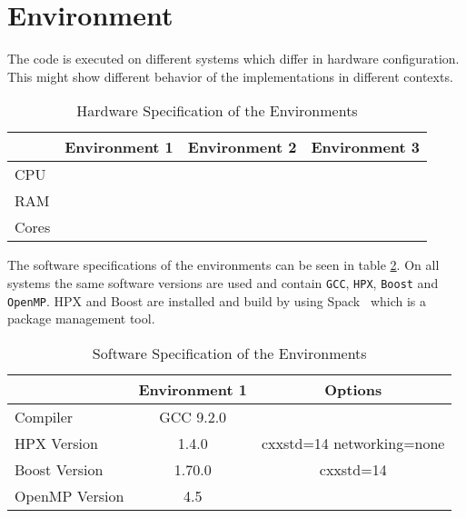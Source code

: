 \section{Environment}
  The code is executed on different systems which differ in hardware configuration.
  This might show different behavior of the implementations in different contexts.

\begin{table}
\centering
\caption{Hardware Specification of the Environments}
\begin{tabular}[h]{l c c c}
 & Environment 1 & Environment 2 & Environment 3 \\\hline
CPU &  &  &  \\
RAM &  &  &  \\
Cores &  &  &  \\\hline
\end{tabular}
\label{tab:hardEnv}
\end{table}

The software specifications of the environments can be seen in table \ref{tab:softEnv}.
On all systems the same software versions are used and contain \texttt{GCC}, \texttt{HPX}, \texttt{Boost} and \texttt{OpenMP}.
HPX and Boost are installed and build by using Spack~\cite{Spack.2020} which is a package management tool.
\begin{table}
\centering
\caption{Software Specification of the Environments}
\begin{tabular}[h]{l c c}
\centering
 & Environment 1 & Options\\\hline
Compiler & GCC 9.2.0 & \\
HPX Version & 1.4.0 & cxxstd=14 networking=none  \\
Boost Version & 1.70.0 & cxxstd=14 \\
OpenMP Version & 4.5 & \\\hline
\end{tabular}
\label{tab:softEnv}
\end{table}